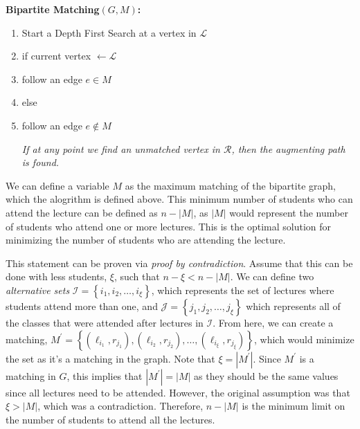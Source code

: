 \documentclass[addpoints]{exam}
\begin{document}
\begin{questions}
\begin{solution}
{\bf Bipartite Matching}$(G,M)${\bf:}
\vspace{-1em}\begin{enumerate}
\itemsep-0.5em
\item Start a Depth First Search at a vertex in $\mathcal{L}$
\item if current vertex $\leftarrow \mathcal{L}$

\item \hspace{2.5em} follow an edge $e\in M$

\item else

\item\hspace{2.5em} follow an edge $e\notin M$

{\em If at any point we find an unmatched vertex in $\mathcal{R}$, then the augmenting path is found.}
\end{enumerate}
\vspace{-.75em}
We can define a variable $M$ as the maximum matching of the bipartite graph, which the alogrithm is defined above. This minimum number of students who can attend the lecture can be defined as $n - \left| M \right|$, as $\left| M\right|$ would represent the number of students who attend one or more lectures. This is the optimal solution for minimizing the number of students who are attending the lecture.

This statement can be proven via {\em proof by contradiction}. Assume that this can be done with less students, $\xi$, such that $n-\xi < n - \left| M \right|$. We can define two {\em alternative sets} $\mathcal{I} = \left\{ i_{1}, i_{2}, \ldots, i_{\xi} \right\}$, which represents the set of lectures where students attend more than one, and $\mathcal{J} = \left\{ j_{1}, j_{2}, \ldots, j_{\xi}\right\}$ which represents all of the classes that were attended after lectures in $\mathcal{I}$. From here, we can create a matching, $M^{\prime} = \left\{ \left(\ell_{i_{1}}, r_{j_{1}} \right), \left(\ell_{i_{2}}, r_{j_{2}} \right), \ldots, \left(\ell_{i_{\xi}}, r_{j_{\xi}} \right)  \right\}$, which would minimize the set as it's a matching in the graph. Note that $\xi = \left| M^{\prime}\right|$. Since $M^{\prime}$ is a matching in $G$, this implies that $\left| M^{\prime}\right| = \left| M\right|$ as they should be the same values since all lectures need to be attended. However, the original assumption was that $\xi > \left| M\right|$, which was a contradiction. Therefore, $n-\left| M\right|$ is the minimum limit on the number of students to attend all the lectures.


\end{solution}
\end{questions}
\end{document}

